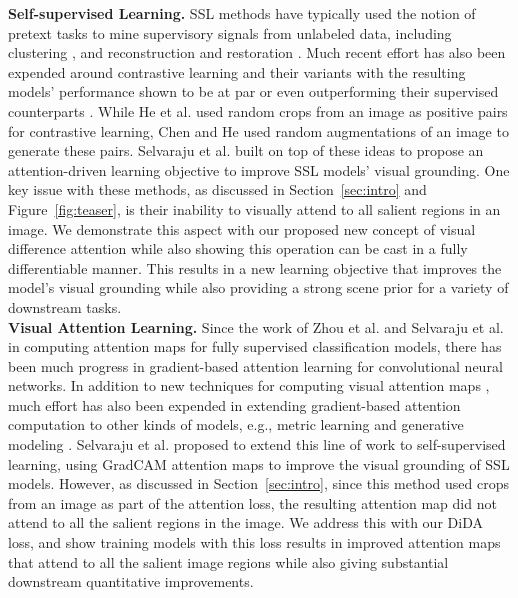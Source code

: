 \documentclass[10pt,twocolumn,letterpaper]{article}
\begin{document}
\noindent \textbf{Self-supervised Learning.} SSL methods have typically used the notion of pretext tasks to mine supervisory signals from unlabeled data, including clustering \cite{coates2012learning,tian2014learning,yang2016joint,caron2018deep,caron2019unsupervised,caron2020unsupervised}, and reconstruction and restoration \cite{pathak2016context,zhang2017split}. Much recent effort has also been expended around contrastive learning and their variants \cite{hadsell2006dimensionality} with the resulting models' performance shown to be at par or even outperforming their supervised counterparts \cite{he2022masked,wei2022masked}. While He et al. \cite{he2020momentum} used random crops from an image as positive pairs for contrastive learning, Chen and He \cite{chen2021exploring} used random augmentations of an image to generate these pairs. Selvaraju et al. \cite{selvaraju2021casting} built on top of these ideas to propose an attention-driven learning objective to improve SSL models' visual grounding. One key issue with these methods, as discussed in Section~\ref{sec:intro} and Figure~\ref{fig:teaser}, is their inability to visually attend to all salient regions in an image. We demonstrate this aspect with our proposed new concept of visual difference attention while also showing this operation can be cast in a fully differentiable manner. This results in a new learning objective that improves the model's visual grounding while also providing a strong scene prior for a variety of downstream tasks.  \\
\textbf{Visual Attention Learning.} Since the work of Zhou et al. \cite{zhou2016learning} and Selvaraju et al. \cite{selvaraju2017grad} in computing attention maps for fully supervised classification models, there has been much progress in gradient-based attention learning for convolutional neural networks. In addition to new techniques for computing visual attention maps \cite{chattopadhay2018grad,wang2020score,jiang2021layercam}, much effort has also been expended in extending gradient-based attention computation to other kinds of models, e.g., metric learning \cite{chen2020adapting,ijcai2022p241} and generative modeling \cite{liu2020towards}. Selvaraju et al. \cite{selvaraju2021casting} proposed to extend this line of work to self-supervised learning, using GradCAM \cite{selvaraju2017grad} attention maps to improve the visual grounding of SSL models. However, as discussed in Section~\ref{sec:intro}, since this method used crops from an image as part of the attention loss, the resulting attention map did not attend to all the salient regions in the image. We address this with our DiDA loss, and show training models with this loss results in improved attention maps that attend to all the salient image regions while also giving substantial downstream quantitative improvements.  \\
\end{document}
